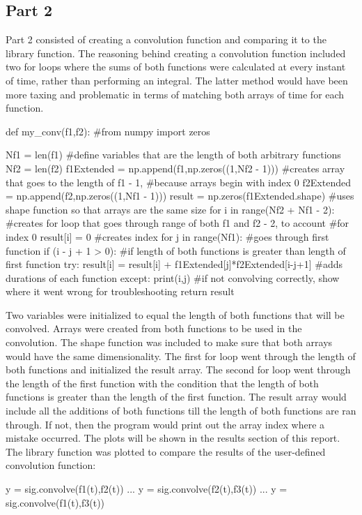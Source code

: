 \documentclass[12pt]{article}
\begin{document}
  \subsection{Part 2}
Part 2 consisted of creating a convolution function and comparing it to the library function.
The reasoning behind creating a convolution function included two for loops where the sums of both functions were calculated at every instant of time, rather than performing an integral. The latter method would have been more taxing and problematic in terms of matching both arrays of time for each function.
\begin{python}
def my_conv(f1,f2):
    #from numpy import zeros
  
    Nf1 = len(f1) #define variables that are the length of both arbitrary functions
    Nf2 = len(f2)
    f1Extended = np.append(f1,np.zeros((1,Nf2 - 1))) #creates array that goes to the length of f1 - 1, 
    #because arrays begin with index 0
    f2Extended = np.append(f2,np.zeros((1,Nf1 - 1)))
    result = np.zeros(f1Extended.shape) #uses shape function so that arrays are the same size
    for i in range(Nf2 + Nf1 - 2):
    #creates for loop that goes through range of both f1 and f2 - 2, to account
                                   #for index 0
        result[i] = 0              #creates index
        for j in range(Nf1):       #goes through first function
            if (i - j + 1 > 0):    #if length of both functions is greater than length of first function
                try:
                    result[i] = result[i] + f1Extended[j]*f2Extended[i-j+1] 
                    #adds durations of each function
                except:
                    print(i,j) 
                    #if not convolving correctly, show where it went wrong for troubleshooting
    return result
\end{python}

Two variables were initialized to equal the length of both functions that will be convolved. Arrays were created from both functions to be used in the convolution. The shape function was included to make sure that both arrays would have the same dimensionality. The first for loop went through the length of both functions and initialized the result array. The second for loop went through the length of the first function with the condition that the length of both functions is greater than the length of the first function. The result array would include all the additions of both functions till the length of both functions are ran through. If not, then the program would print out the array index where a mistake occurred.
\newline
The plots will be shown in the results section of this report.
The library function was plotted to compare the results of the user-defined convolution function:
\begin{python}
y = sig.convolve(f1(t),f2(t))
...
y = sig.convolve(f2(t),f3(t))
...
y = sig.convolve(f1(t),f3(t))
\end{python}
\end{document}
